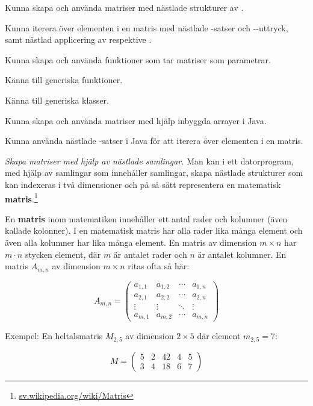 ﻿%


\Exercise{\ExeWeekEIGHT}\label{exe:W08}

\begin{Goals}
\item Kunna skapa och använda matriser med nästlade strukturer av .
\item Kunna iterera över elementen i en matris med nästlade -satser och --uttryck, samt nästlad applicering av  respektive .
\item Kunna skapa och använda funktioner som tar matriser som parametrar.
\item Känna till generiska funktioner.
\item Känna till generiska klasser.
\item Kunna skapa och använda matriser med hjälp inbyggda arrayer i Java.
\item Kunna använda nästlade -satser i Java för att iterera över elementen i en matris.
\end{Goals}

\begin{Preparations}
\item {}
\end{Preparations}

\BasicTasks %

\Task \emph{Skapa matriser med hjälp av nästlade samlingar.} Man kan i ett datorprogram, med hjälp av samlingar som innehåller samlingar, skapa nästlade strukturer som kan indexeras i två dimensioner och på så sätt representera en matematisk \textbf{matris}.\footnote{\href{https://sv.wikipedia.org/wiki/Matris}{sv.wikipedia.org/wiki/Matris}}
\begin{Background}
En \textbf{matris} inom matematiken innehåller ett antal rader och kolumner (även kallade kolonner). I en matematisk matris har alla rader lika många element och även alla kolumner har lika många element. En matris av dimension $m\times{}n$ har $m \cdot n$ stycken element, där $m$ är antalet rader och $n$ är antalet kolumner. En matris $A_{m,n}$ av dimension $m\times{}n$ ritas ofta så här:

\[
A_{m,n} =
 \begin{pmatrix}
  a_{1,1} & a_{1,2} & \cdots & a_{1,n} \\
  a_{2,1} & a_{2,2} & \cdots & a_{2,n} \\
  \vdots  & \vdots  & \ddots & \vdots  \\
  a_{m,1} & a_{m,2} & \cdots & a_{m,n}
 \end{pmatrix}
\]

\noindent Exempel: En heltalsmatris $M_{2,5}$ av dimension $2\times{}5$ där element $m_{2,5}=7$:

\[
M=
  \begin{pmatrix}
    5 & 2 & 42 & 4 & 5 \\
    3 & 4 & 18 & 6 & 7
  \end{pmatrix}
\]
\end{Background}

